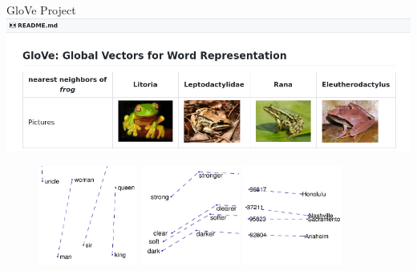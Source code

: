 \documentclass{beamer}
\begin{document}
\begin{frame}{GloVe Project}
    \includegraphics[width=\textwidth]{Glove_github_small.png}

\begin{figure}
   \includegraphics[width=0.29\textwidth]{man_woman_small.jpg}
   \hfill
   \includegraphics[width=0.29\textwidth]{comparative_superlative_small.jpg}
   \hfill
   \includegraphics[width=0.29\textwidth]{city_zip_small.jpg}
\end{figure}

\end{frame}
\end{document}
